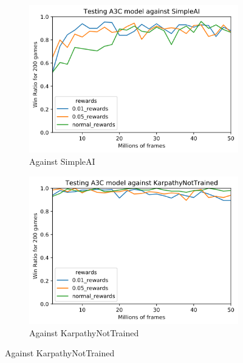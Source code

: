 \begin{figure}[h!]
    \centering
    \begin{subfigure}{0.49\textwidth}
        \centering
        \includegraphics[width=\textwidth]{figures/a3c-test-simpleai.png}
        \caption{Against SimpleAI}
        \label{fig:test-a3c-simpleai}
    \end{subfigure}
    \begin{subfigure}{0.49\textwidth}
        \centering
        \includegraphics[width=\textwidth]{figures/a3c-test-karpathy-not-trained.png}
        \caption{Against KarpathyNotTrained}
        \label{fig:test-a3c-karpathy}
    \end{subfigure}


\end{figure}
